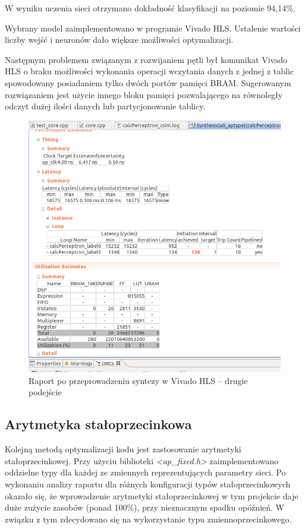 W wyniku uczenia sieci otrzymano dokładność klasyfikacji na poziomie 94,14\%.

Wybrany model zaimplementowano w programie Vivado HLS. Ustalenie wartości liczby wejść i neuronów dało większe możliwości optymalizacji. 

Następnym problemem związanym z rozwijaniem pętli był komunikat Vivado HLS o braku możliwości wykonania operacji wczytania danych z jednej z tablic spowodowany posiadaniem tylko dwóch portów pamięci BRAM. Sugerowanym rozwiązaniem jest użycie innego bloku pamięci pozwalającego na równoległy odczyt dużej ilości danych lub partycjonowanie tablicy.

\begin{figure}[!h]
  \centering
  \includegraphics[width=\textwidth]{img/hls-report2.png}
  \caption{Raport po przeprowadzeniu syntezy w Vivado HLS -- drugie podejście}
  \label{hls-report2}
\end{figure}

\subsection{Arytmetyka stałoprzecinkowa}

Kolejną metodą optymalizacji kodu jest zastosowanie arytmetyki stałoprzecinkowej. Przy użyciu biblioteki \emph{<ap\_fixed.h>} zaimplementowano oddzielne typy dla każdej ze zmiennych reprezentujących parametry sieci. Po wykonaniu analizy raportu dla różnych konfiguracji typów stałoprzecinkowych okazało się, że wprowadzenie arytmetyki stałoprzecinkowej w tym projekcie daje duże zużycie zasobów (ponad 100\%), przy nieznacznym spadku opóźnień. W związku z tym zdecydowano się na wykorzystanie typu zmiennoprzecinkowego.


